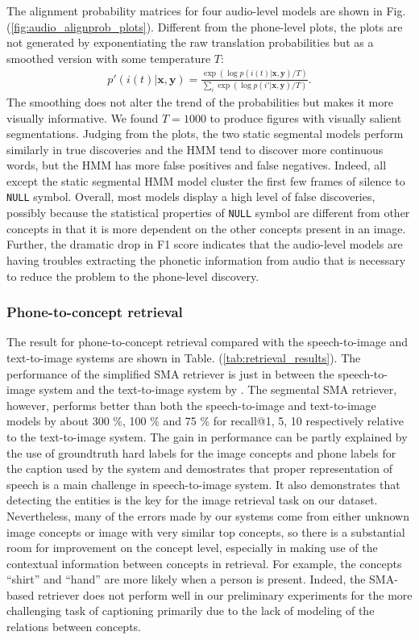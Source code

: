 \documentclass[journal]{IEEEtran}
\begin{document}
The alignment probability matrices for four audio-level models are shown in Fig. (\ref{fig:audio_alignprob_plots}). Different from the phone-level plots, the plots are not generated by exponentiating the raw translation probabilities but as a smoothed version with some temperature $T$:
\begin{align*}
    p'(i(t)|\mathbf x, \mathbf y) = \frac{\exp(\log p(i(t)|\mathbf x, \mathbf y)/T)}{\sum_i \exp(\log p(i'|\mathbf x, \mathbf y)/T)}.
\end{align*}
The smoothing does not alter the trend of the probabilities but makes it more visually informative. We found $T=1000$ to produce figures with visually salient segmentations. Judging from the plots, the two static segmental models perform similarly in true discoveries and the HMM tend to discover more continuous words, but the HMM has more false positives and false negatives. Indeed, all except the static segmental HMM model cluster the first few frames of silence to \texttt{NULL} symbol. Overall, most models display a high level of false discoveries, possibly because the statistical properties of \texttt{NULL} symbol are different from other concepts in that it is more dependent on the other concepts present in an image. Further, the dramatic drop in F1 score indicates that the audio-level models are having troubles extracting the phonetic information from audio that is necessary to reduce the problem to the phone-level discovery. 

\subsubsection{Phone-to-concept retrieval}
The result for phone-to-concept retrieval compared with the speech-to-image and text-to-image systems are shown in Table. (\ref{tab:retrieval_results}). The performance of the simplified SMA retriever is just in between the speech-to-image system \cite{Harwath15} and the text-to-image system by \cite{Karpathy15}. The segmental SMA retriever, however, performs better than both the speech-to-image and text-to-image models by about 300 \%, 100 \% and 75 \% for recall@1, 5, 10 respectively relative to the text-to-image system. The gain in performance can be partly explained by the use of groundtruth hard labels for the image concepts and phone labels for the caption used by the system and demostrates that proper representation of speech is a main challenge in speech-to-image system. It also demonstrates that detecting the entities is the key for the image retrieval task on our dataset. Nevertheless, many of the errors made by our systems come from either unknown image concepts or image with very similar top concepts, so there is a substantial room for improvement on the concept level,  especially in making use of the contextual information between concepts in retrieval. For example, the concepts ``shirt'' and ``hand'' are more likely when a person is present. Indeed, the SMA-based retriever does not perform well in our preliminary experiments for the more challenging task of captioning primarily due to the lack of modeling of the relations between concepts.  
\end{document}
